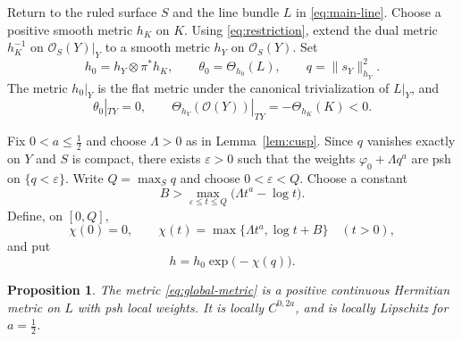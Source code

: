\documentclass[11pt]{amsart}
\newtheorem{proposition}[theorem]{Proposition}
\theoremstyle{definition}
\theoremstyle{remark}
\numberwithin{equation}{section}
\newcommand{\OO}{\mathcal O}
\begin{document}
Return to the ruled surface $S$ and the line bundle $L$ in
\eqref{eq:main-line}. Choose a positive smooth metric $h_K$ on $K$.
Using \eqref{eq:restriction}, extend the dual metric $h_K^{-1}$ on
$\OO_S(Y)|_Y$ to a smooth metric $h_Y$ on $\OO_S(Y)$. Set
\begin{equation}\label{eq:baseline-metric}
 h_0=h_Y\otimes\pi^*h_K,\qquad
 \theta_0=\Theta_{h_0}(L),\qquad
 q=\|s_Y\|_{h_Y}^2.
\end{equation}
The metric $h_0|_Y$ is the flat metric under the canonical
trivialization of $L|_Y$, and
\begin{equation}\label{eq:curvature-restrictions}
 \theta_0|_{TY}=0,\qquad
 \Theta_{h_Y}(\OO(Y))|_{TY}=-\Theta_{h_K}(K)<0.
\end{equation}

Fix $0<a\le\tfrac12$ and choose $\Lambda>0$ as in
Lemma~\ref{lem:cusp}. Since $q$ vanishes exactly on $Y$ and $S$ is
compact, there exists $\varepsilon>0$ such that the weights
$\varphi_0+\Lambda q^a$ are psh on $\{q<\varepsilon\}$.
Write $Q=\max_Sq$ and choose $0<\varepsilon<Q$. Choose a constant
\begin{equation}\label{eq:B-choice}
 B>\max_{\varepsilon\le t\le Q}\bigl(\Lambda t^a-\log t\bigr).
\end{equation}
Define, on $[0,Q]$,
\begin{equation}\label{eq:chi}
 \chi(0)=0,\qquad
 \chi(t)=\max\{\Lambda t^a,\log t+B\}\quad(t>0),
\end{equation}
and put
\begin{equation}\label{eq:global-metric}
 h=h_0\exp\bigl(-\chi(q)\bigr).
\end{equation}

\begin{proposition}\label{prop:continuous-metric}
The metric \eqref{eq:global-metric} is a positive continuous Hermitian
metric on $L$ with psh local weights. It is locally $C^{0,2a}$,
and is locally Lipschitz for $a=\tfrac12$.
\end{proposition}
\end{document}
